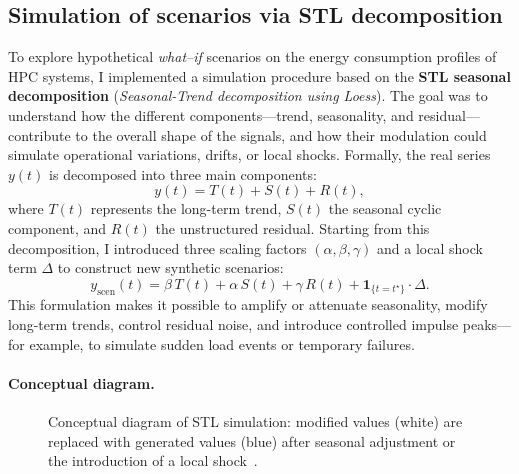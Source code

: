 
\subsection{Simulation of scenarios via STL decomposition}

To explore hypothetical \emph{what--if} scenarios on the energy consumption profiles of HPC systems, I implemented a simulation procedure based on the \textbf{STL seasonal decomposition} (\emph{Seasonal-Trend decomposition using Loess}).  
The goal was to understand how the different components—trend, seasonality, and residual—contribute to the overall shape of the signals, and how their modulation could simulate operational variations, drifts, or local shocks.  
Formally, the real series $y(t)$ is decomposed into three main components:
\[
y(t) = T(t) + S(t) + R(t),
\]
where $T(t)$ represents the long-term trend, $S(t)$ the seasonal cyclic component, and $R(t)$ the unstructured residual.  
Starting from this decomposition, I introduced three scaling factors $(\alpha, \beta, \gamma)$ and a local shock term $\Delta$ to construct new synthetic scenarios:
\[
y_{\text{scen}}(t) = \beta \, T(t) + \alpha \, S(t) + \gamma \, R(t) + \mathbf{1}_{\{t=t^\star\}} \cdot \Delta.
\]
This formulation makes it possible to amplify or attenuate seasonality, modify long-term trends, control residual noise, and introduce controlled impulse peaks—for example, to simulate sudden load events or temporary failures.

\paragraph{Conceptual diagram.}
\begin{figure}[H]
\centering
{}
\caption{Conceptual diagram of STL simulation: modified values (white) are replaced with generated values (blue) after seasonal adjustment or the introduction of a local shock~\cite{shumway2017time, cleveland1990stl}.}
\label{fig:stl_schema_concettuale}
\end{figure}

